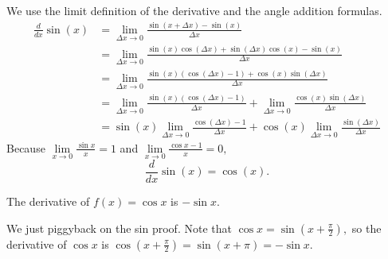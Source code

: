 \documentclass[blue,onecol]{shooting}
\begin{document}
\begin{pro}
We use the limit definition of the derivative and the angle addition formulas.
\begin{align*}
\frac{d}{dx}\sin(x) &= \lim_{\Delta x \to 0} \frac{\sin(x+\Delta x) - \sin(x)}{\Delta x} \\
&= \lim_{\Delta x \to 0} \frac{\sin(x)\cos(\Delta x) + \sin(\Delta x)\cos(x) - \sin(x)}{\Delta x} \\
&= \lim_{\Delta x \to 0} \frac{\sin(x)(\cos(\Delta x) - 1) + \cos(x)\sin(\Delta x)}{\Delta x} \\
&= \lim_{\Delta x \to 0} \frac{\sin(x)(\cos(\Delta x) - 1)}{\Delta x} + \lim_{\Delta x \to 0} \frac{\cos(x)\sin(\Delta x)}{\Delta x} \\
&= \sin(x) \lim_{\Delta x \to 0} \frac{\cos(\Delta x) - 1}{\Delta x} + \cos(x) \lim_{\Delta x \to 0} \frac{\sin(\Delta x)}{\Delta x}
\end{align*}
Because $\lim\limits_{x\to 0}\frac{\sin x}{x}=1$ and $\lim\limits_{x\to 0}\frac{\cos x-1}{x}=0,$
\[\frac{d}{dx}\sin(x) = \cos(x).\]
\end{pro}

\begin{theo}
The derivative of $f(x) = \cos x$ is $-\sin x.$
\end{theo}


\begin{pro}
We just piggyback on the sin proof. Note that $\cos x=\sin(x+\frac{\pi}{2}),$ so the derivative of $\cos x$ is $\cos(x+\frac{\pi}{2})=\sin(x+\pi)=-\sin x.$
\end{pro}
\end{document}
